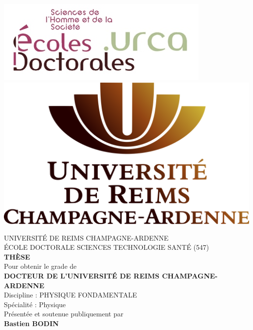 \includegraphics[scale=1]{./images/logo-ed.jpg} 
\hfill
\includegraphics[scale=0.03]{./images/logo-urca.png} 

\vspace{2cm}

\begin{center}
UNIVERSITÉ DE REIMS CHAMPAGNE-ARDENNE\\
\vspace{12pt}
ÉCOLE DOCTORALE SCIENCES TECHNOLOGIE SANTÉ (547)\\
\vspace{12pt}
\textbf{THÈSE}\\
\vspace{12pt}
Pour obtenir le grade de\\
\vspace{12pt}
\textbf{DOCTEUR DE L’UNIVERSITÉ DE REIMS CHAMPAGNE-ARDENNE}\\
\vspace{12pt}
Discipline : PHYSIQUE FONDAMENTALE\\
\vspace{12pt}
Spécialité : Physique\\
\vspace{12pt}
Présentée et soutenue publiquement par\\
\vspace{12pt}
\textbf{Bastien BODIN}
\end{center}

